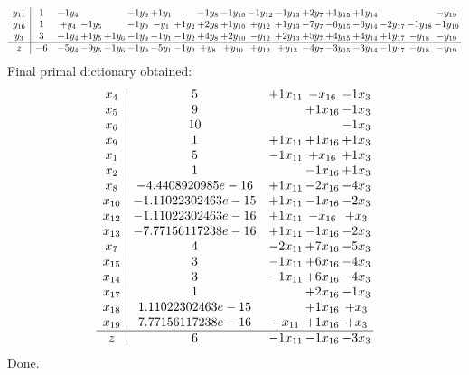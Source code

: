 \documentclass[11pt]{article}
\begin{document}
\[\begin{array}{c| c c@{\hskip 2pt} c@{\hskip 2pt} c@{\hskip 2pt} c@{\hskip 2pt} c@{\hskip 2pt} c@{\hskip 2pt} c@{\hskip 2pt} c@{\hskip 2pt} c@{\hskip 2pt} c@{\hskip 2pt} c@{\hskip 2pt} c@{\hskip 2pt} c@{\hskip 2pt} c@{\hskip 2pt} c@{\hskip 2pt} c@{\hskip 2pt} }
 y_{11}   &  1 & -1 y_{4} &    &   & -1 y_{9} & + 1 y_{1} &   & -1 y_{8} & -1 y_{10} & -1 y_{12} & -1 y_{13} & + 2 y_{7} & + 1 y_{15} & + 1 y_{14} &    &   & - y_{19}\\
 y_{16}   &  1 & +  y_{4} & -1 y_{5} &   & -1 y_{9} & - y_{1} & + 1 y_{2} & + 2 y_{8} & + 1 y_{10} & +  y_{12} & + 1 y_{13} & -7 y_{7} & -6 y_{15} & -6 y_{14} & -2 y_{17} & -1 y_{18} & -1 y_{19}\\
 y_{3}   &  3 & + 1 y_{4} & + 1 y_{5} & + 1 y_{6} & -1 y_{9} & -1 y_{1} & -1 y_{2} & + 4 y_{8} & + 2 y_{10} & - y_{12} & + 2 y_{13} & + 5 y_{7} & + 4 y_{15} & + 4 y_{14} & + 1 y_{17} & - y_{18} & - y_{19}\\
\hline
z    &  -6 & -5 y_{4} & -9 y_{5} & -1 y_{6} & -1 y_{9} & -5 y_{1} & -1 y_{2} & +  y_{8} & +  y_{10} & +  y_{12} & +  y_{13} & -4 y_{7} & -3 y_{15} & -3 y_{14} & -1 y_{17} & - y_{18} & - y_{19}\\
\end{array}\]
 Final primal dictionary obtained: 
\[\begin{array}{c| c c@{\hskip 2pt} c@{\hskip 2pt} c@{\hskip 2pt} }
 x_{4}   &  5 & + 1 x_{11} & - x_{16} & -1 x_{3}\\
 x_{5}   &  9  &   & + 1 x_{16} & -1 x_{3}\\
 x_{6}   &  10  &    &   & -1 x_{3}\\
 x_{9}   &  1 & + 1 x_{11} & + 1 x_{16} & + 1 x_{3}\\
 x_{1}   &  5 & -1 x_{11} & +  x_{16} & + 1 x_{3}\\
 x_{2}   &  1  &   & -1 x_{16} & + 1 x_{3}\\
 x_{8}   &  -4.4408920985e-16 & + 1 x_{11} & -2 x_{16} & -4 x_{3}\\
 x_{10}   &  -1.11022302463e-15 & + 1 x_{11} & -1 x_{16} & -2 x_{3}\\
 x_{12}   &  -1.11022302463e-16 & + 1 x_{11} & - x_{16} & +  x_{3}\\
 x_{13}   &  -7.77156117238e-16 & + 1 x_{11} & -1 x_{16} & -2 x_{3}\\
 x_{7}   &  4 & -2 x_{11} & + 7 x_{16} & -5 x_{3}\\
 x_{15}   &  3 & -1 x_{11} & + 6 x_{16} & -4 x_{3}\\
 x_{14}   &  3 & -1 x_{11} & + 6 x_{16} & -4 x_{3}\\
 x_{17}   &  1  &   & + 2 x_{16} & -1 x_{3}\\
 x_{18}   &  1.11022302463e-15  &   & + 1 x_{16} & +  x_{3}\\
 x_{19}   &  7.77156117238e-16 & +  x_{11} & + 1 x_{16} & +  x_{3}\\
\hline
z    &  6 & -1 x_{11} & -1 x_{16} & -3 x_{3}\\
\end{array}\]
Done.
\end{document}
